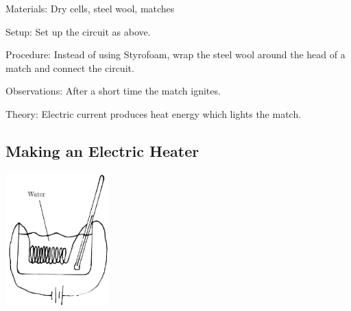 \begin{multicols}{2}
\begin{description*}
\item[Materials:]{Dry cells, steel wool, matches}
\item[Setup:]{Set up the circuit as above.}
\item[Procedure:]{Instead of using Styrofoam, wrap the steel wool around the head of a match and connect the circuit.}
\item[Observations:]{After a short time the match ignites.}
\item[Theory:]{Electric current produces heat energy which lights the match.}
\end{description*}

\subsection{Making an Electric Heater}

\begin{center}
\includegraphics[width=0.3\textwidth]{./img/electric-heater.png}
\end{center}


\end{multicols}
